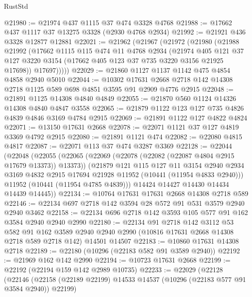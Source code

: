 \begin{lexlean}{RustStd}
\begin{coremodule}
@21980 := @21974 @437 @1115 @37 @474 @3328 @4768
@21988 := @17662 @437 @1117 @37 @13275 @3328 (@2930 @4768 @2934)
@21992 := @21921 @436 @3328 @12877 @12881
@22021 := @21962
    (@21967
      (@21972
        (@21980
          (@21988
            @21992
            (@17662
              @1115
              @115
              @474
              @11
              @4768
              @2934
              (@21974
                @405
                @121
                @37
                @127
                @3220
                @3154
                (@17662 @405 @123 @37 @735 @3220 @3156 @21925 @17698))
              @17697)))))
@22029 := @21860 @1127 @1137 @1142 @475 @4854 @4858 @2940 @5010
@22044 := @10302
    @17631
    @2668
    @2718
    @142
    @14308
    @2718
    @1125
    @589
    @698
    @4851
    @3595
    @91
    @2909
    @4776
    @2915
@22048 := @21891 @1125 @14308 @4840 @4849
@22055 := @21870 @560 @1124 @14326 @14308 @4840 @4847 @3558
@22065 := @21879 @1122 @123 @127 @735 @4826 @4839 @4846 @3169 @4784 @2915
@22069 := @21891 @1122 @127 @4822 @4824
@22071 := @13150 @17631 @2668
@22078 := @22071 @1121 @37 @127 @4819 @3369 @4792 @2915
@22080 := @21891 @1121 @474
@22082 := @22080 @4815 @4817
@22087 := @22071 @113 @37 @474 @3287 @3369
@22128 := @22044
    (@22048
      (@22055
        (@22065
          (@22069 (@22078 (@22082 (@22087 @4804 @2915 @17679 @13373)) @13373))
          (@21879
            @121
            @115
            @127
            @11
            @3154
            @2940
            @2934
            @3169
            @4832
            @2915
            @17694
            @21928
            @11952
            (@10441 (@11954 @4833 @2940)))
          @11952
          (@10441 (@11954 @4785 @4839)))
        @14424
        @14427
        @14430
        @14434
        @14439
        @14445))
@22134 := @10764 @17631 @17631 @2668 @14308 @2718 @589
@22146 := @22134 @697 @2718 @142 @3594 @28 @572 @91 @531 @3579 @2940 @2940 @3462
@22158 := @22134 @696 @2718 @142 @3593 @105 @577 @91 @162 @3584 @2940 @2940 @2990
@22180 := @22134
    @91
    @2718
    @142
    @3112
    @53
    @582
    @91
    @162
    @3589
    @2940
    @2940
    @2990
    (@10816 @17631 @2668 @14308 @2718 @589 @2718 @142)
    @14501
    @14507
@22183 := @10860 @17631 @14308 @2718
@22189 := @22180 (@10296 (@22183 @582 @91 @3589 @2940))
@22192 := @21969 @162 @142 @2990
@22194 := @10723 @17631 @2668
@22199 := @22192 (@22194 @159 @142 @2989 @10735)
@22233 := @22029
    (@22128
      (@22146
        (@22158 (@22189 @22199) @14533 @14537 (@10296 (@22183 @577 @91 @3584 @2940)) @22199)

\end{coremodule}
\end{lexlean}

